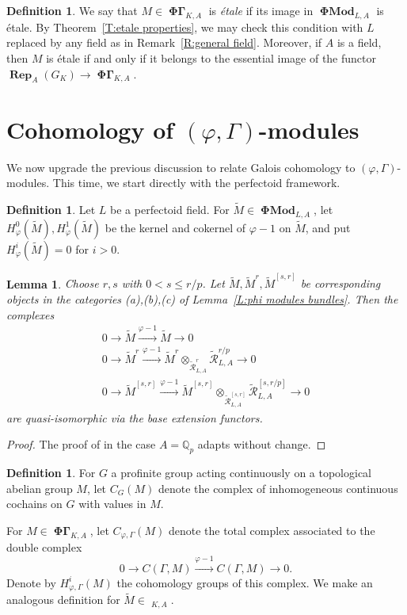 \documentclass[12pt]{amsart}
\newtheorem{lemma}[theorem]{Lemma}
\theoremstyle{definition}
\newtheorem{defn}[theorem]{Definition}
\numberwithin{equation}{theorem}
\newcommand{\QQ}{\mathbb{Q}}
\newcommand{\calR}{\mathcal{R}}
\DeclareMathOperator{\PhiGamma}{\mathbf{\Phi \Gamma}}
\DeclareMathOperator{\PhiGammatilde}{\widetilde{\mathbf{\Phi \Gamma}}}
\DeclareMathOperator{\PhiMod}{\mathbf{\Phi Mod}}
\DeclareMathOperator{\Rep}{\mathbf{Rep}}
\begin{document}
\begin{defn}
We say that $M \in \PhiGamma_{K,A}$ is \emph{\'etale} if its image in $\PhiMod_{L,A}$ is \'etale.
By Theorem~\ref{T:etale properties}, we may check this condition 
with $L$ replaced by any field as in
Remark~\ref{R:general field}.
Moreover, if $A$ is a field, then 
$M$ is \'etale if and only if it belongs
to the essential image of the functor $\Rep_A(G_K)\to \PhiGamma_{K,A}$.
\end{defn}

\section{Cohomology of $(\varphi, \Gamma)$-modules}

We now upgrade the previous discussion to relate Galois cohomology to $(\varphi, \Gamma)$-modules. This time, we start directly with the perfectoid framework.
\begin{defn}
Let $L$ be a perfectoid field.
For $\tilde{M} \in \PhiMod_{L,A}$, let $H^0_{\varphi}(\tilde{M}), H^1_{\varphi}(\tilde{M})$ be the kernel and cokernel of $\varphi-1$ on $\tilde{M}$, and put $H^i_{\varphi}(\tilde{M}) = 0$ for $i>0$.
\end{defn}

\begin{lemma} \label{L:truncate cohomology}
Choose $r,s$ with $0 < s \leq r/p$. Let $\tilde{M}, \tilde{M}^r, \tilde{M}^{[s,r]}$
be corresponding objects in the categories (a),(b),(c) of Lemma~\ref{L:phi modules bundles}.
Then the complexes
\begin{gather*}
0 \to \tilde{M} \stackrel{\varphi-1}{\to} \tilde{M} \to 0 \\
0 \to \tilde{M}^r \stackrel{\varphi-1}{\to} \tilde{M}^r \otimes_{\tilde{\calR}^r_{L,A}} \tilde{\calR}^{r/p}_{L,A} \to 0 \\
0 \to \tilde{M}^{[s,r]} \stackrel{\varphi-1}{\to} \tilde{M}^{[s,r]} \otimes_{\tilde{\calR}^{[s,r]}_{L,A}} \tilde{\calR}^{[s,r/p]}_{L,A} \to 0
\end{gather*}
are quasi-isomorphic via the base extension functors.
\end{lemma}
\begin{proof}
The proof of \cite[Proposition~6.3.19]{kedlaya-liu1} in the case $A = \QQ_p$ adapts without change.
\end{proof}

\begin{defn}
For $G$ a profinite group acting continuously on a topological abelian group $M$,
let $C_G(M)$ denote the complex of inhomogeneous continuous cochains on $G$ with values in $M$.

For $M \in \PhiGamma_{K,A}$, let $C_{\varphi, \Gamma}(M)$ denote the total complex associated to the double complex
\[
0 \to C(\Gamma,M) \stackrel{\varphi-1}{\to} C(\Gamma,M) \to 0.
\]
Denote by $H^i_{\varphi, \Gamma}(M)$ the cohomology groups of this complex.
We make an analogous definition for $\tilde{M} \in \PhiGammatilde_{K,A}$.
\end{defn}
\end{document}
